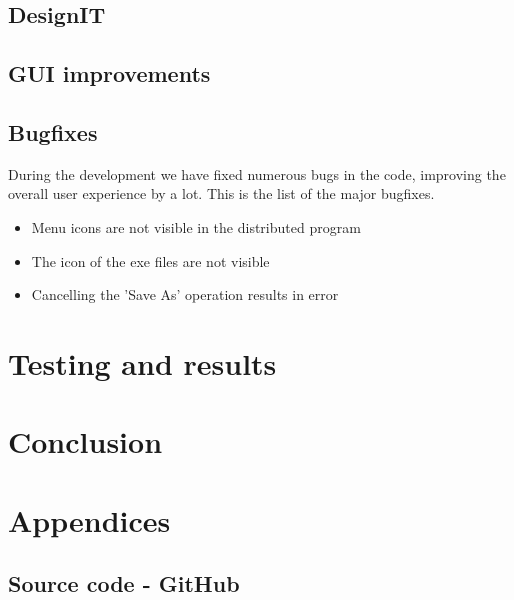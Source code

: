 \documentclass[a4paper, 11pt, article]{report}
\begin{document}
\section{DesignIT}

\section{GUI improvements}

\section{Bugfixes}

During the development we have fixed numerous bugs in the code, improving the overall user experience by a lot. This is the list of the major bugfixes.

\begin{itemize}
\item Menu icons are not visible in the distributed program
\item The icon of the exe files are not visible
\item Cancelling the 'Save As' operation results in error
\end{itemize}


\chapter{Testing and results}


\chapter{Conclusion}


\chapter{Appendices}

\section{Source code - GitHub}
\end{document}
